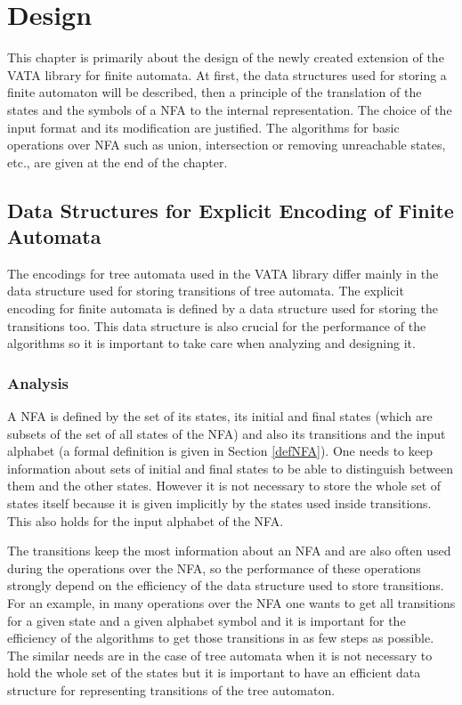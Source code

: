 \chapter{Design}
\label{design}
This chapter is primarily about the design of the newly created extension of the VATA library for finite automata. 
At first, the data structures used for storing a finite automaton will be described, then a principle of the translation of the states and the symbols of a NFA 
to the internal representation. The choice of the input format and its modification are justified.  
The algorithms for basic operations over NFA such as union, intersection or removing unreachable states, etc., are given at the end of the chapter.

\section{Data Structures for Explicit Encoding of Finite Automata}
The encodings for tree automata used in the VATA library differ mainly in the data structure used for storing transitions of tree automata. The explicit encoding
for finite automata is defined by a data structure used for storing the transitions too. 
This data structure is also crucial for the performance of the algorithms so it is important to take care when analyzing and designing it. 

\label{data structure explicit}
\subsection{Analysis}
\label{analysis}
A NFA is defined by the set of its states, its initial and final states (which are subsets of the set of all states of the NFA) and also its
transitions and the input alphabet (a formal definition is given in Section \ref{defNFA}). 
One needs to keep information about sets of initial and final states to be able to distinguish
between them and the other states. However it is not necessary to store the whole set of states itself because it is given implicitly by the states used 
inside transitions. This also holds for the input alphabet of the NFA. 

The transitions keep the most information about an NFA and are also often used
during the operations over the NFA, so the performance of these operations strongly depend on the efficiency of the data structure used to store transitions. 
For an example, in many operations over the NFA one wants to get all transitions for a given state and a given alphabet symbol and it is important for 
the efficiency of the algorithms to get those transitions in as few steps as possible. The similar needs are in the case
of tree automata when it is not necessary to hold the whole set of the states but it is important to have an efficient data structure for representing 
transitions of the tree automaton.

